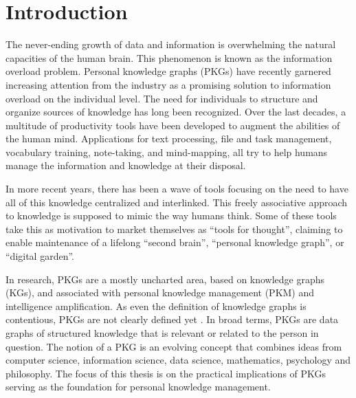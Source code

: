 \chapter{Introduction} \label{ch:introduction}

The never-ending growth of data and information is overwhelming the natural capacities of the human brain. This phenomenon is known as the information overload problem. Personal knowledge graphs (PKGs) have recently garnered increasing attention from the industry as a promising solution to information overload on the individual level. The need for individuals to structure and organize sources of knowledge has long been recognized. Over the last decades, a multitude of productivity tools have been developed to augment the abilities of the human mind. Applications for text processing, file and task management, vocabulary training, note-taking, and mind-mapping, all try to help humans manage the information and knowledge at their disposal. 


In more recent years, there has been a wave of tools focusing on the need to have all of this knowledge centralized and interlinked. This freely associative approach to knowledge is supposed to mimic the way humans think. Some of these tools take this as motivation to market themselves as “tools for thought”, claiming to enable maintenance of a lifelong “second brain”, “personal knowledge graph”, or “digital garden”.

In research, PKGs are a mostly uncharted area, based on knowledge graphs (KGs), and associated with personal knowledge management (PKM) and intelligence amplification. As even the definition of knowledge graphs is contentious, PKGs are not clearly defined yet \cite{Hogan2021KG, commonsenseKG}. In broad terms, PKGs are data graphs of structured knowledge that is relevant or related to the person in question. The notion of a PKG is an evolving concept that combines ideas from computer science, information science, data science, mathematics, psychology and philosophy. The focus of this thesis is on the practical implications of PKGs serving as the foundation for personal knowledge management.





